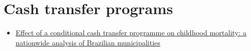 \documentclass[]{book}
\providecommand{\tightlist}{%
  \setlength{\itemsep}{0pt}\setlength{\parskip}{0pt}}
\begin{document}
\hypertarget{cash-transfer-programs}{%
\section*{Cash transfer programs}\label{cash-transfer-programs}}

\begin{itemize}
\tightlist
\item
  \href{https://sci-hub.tw/https://doi.org/10.1016/S0140-6736(13)60715-1}{Effect of a conditional cash transfer programme on childhood mortality: a nationwide analysis of Brazilian municipalities}
\end{itemize}


\end{document}
